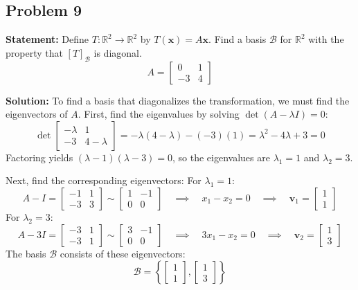 \documentclass[11pt, a4paper]{article}
\theoremstyle{definition}
\theoremstyle{remark}
\newcommand{\R}{\mathbb{R}}
\begin{document}
\subsection{Problem 9}
\textbf{Statement:} Define $T: \R^2 \to \R^2$ by $T(\mathbf{x}) = A\mathbf{x}$. Find a basis $\mathcal{B}$ for $\R^2$ with the property that $[T]_\mathcal{B}$ is diagonal.
\[
A = \begin{bmatrix} 0 & 1 \\ -3 & 4 \end{bmatrix}
\]

\textbf{Solution:}
To find a basis that diagonalizes the transformation, we must find the eigenvectors of $A$.
First, find the eigenvalues by solving $\det(A - \lambda I) = 0$:
\[
\det \begin{bmatrix} -\lambda & 1 \\ -3 & 4 - \lambda \end{bmatrix} = -\lambda(4 - \lambda) - (-3)(1) = \lambda^2 - 4\lambda + 3 = 0
\]
Factoring yields $(\lambda - 1)(\lambda - 3) = 0$, so the eigenvalues are $\lambda_1 = 1$ and $\lambda_2 = 3$.

Next, find the corresponding eigenvectors:
For $\lambda_1 = 1$:
\[
A - I = \begin{bmatrix} -1 & 1 \\ -3 & 3 \end{bmatrix} \sim \begin{bmatrix} 1 & -1 \\ 0 & 0 \end{bmatrix} \quad \implies \quad x_1 - x_2 = 0 \quad \implies \quad \mathbf{v}_1 = \begin{bmatrix} 1 \\ 1 \end{bmatrix}
\]
For $\lambda_2 = 3$:
\[
A - 3I = \begin{bmatrix} -3 & 1 \\ -3 & 1 \end{bmatrix} \sim \begin{bmatrix} 3 & -1 \\ 0 & 0 \end{bmatrix} \quad \implies \quad 3x_1 - x_2 = 0 \quad \implies \quad \mathbf{v}_2 = \begin{bmatrix} 1 \\ 3 \end{bmatrix}
\]
The basis $\mathcal{B}$ consists of these eigenvectors:
\[
\mathcal{B} = \left\{ \begin{bmatrix} 1 \\ 1 \end{bmatrix}, \begin{bmatrix} 1 \\ 3 \end{bmatrix} \right\}
\]
\end{document}
